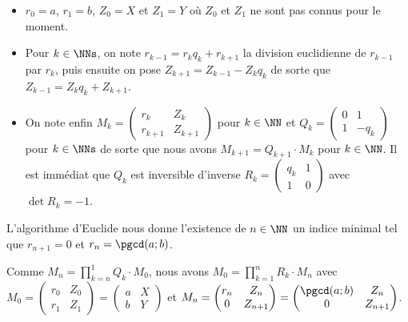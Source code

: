 \begin{itemize}[label=\small\textbullet]
	\item $r_0 = a$, $r_1 = b$, $Z_0 = X$ et $Z_1 = Y$ où $Z_0$ et $Z_1$ ne sont pas connus pour le moment.

	\item Pour $k \in \NNs$, on note $r_{k-1} = r_k q_k + r_{k+1}$ la division euclidienne de $r_{k-1}$ par $r_k$, puis ensuite on pose $Z_{k+1} = Z_{k-1} - Z_k q_k$ de sorte que $Z_{k-1} = Z_k q_k + Z_{k+1}$.

	\item On note enfin
	      $M_k 
           =
           \begin{pmatrix}
          	  r_k     & Z_k     \\ 
          	  r_{k+1} & Z_{k+1}
           \end{pmatrix}$
          pour $k \in \NN$ et
	      $Q_k 
           =
           \begin{pmatrix}
          	  0 & 1     \\ 
          	  1 & - q_k
           \end{pmatrix}$
          pour $k \in \NNs$ de sorte que nous avons $M_{k+1} = Q_{k+1} \cdot M_k$ pour $k \in \NN$. Il est immédiat que $Q_k$ est inversible d'inverse
	      $R_k 
           =
           \begin{pmatrix}
          	  q_k & 1 \\ 
          	  1   & 0
           \end{pmatrix}$
          avec $\det R_k = -1$.
\end{itemize}


L'algorithme d'Euclide nous donne l'existence de $n \in \NN$ un indice minimal tel que $r_{n+1} = 0$ et $r_n = \pgcd(a ; b)$.


Comme
$\displaystyle M_n = \prod_{k = n}^{1} Q_k \cdot M_0$,
nous avons
$\displaystyle M_0 = \prod_{k = 1}^{n} R_k \cdot M_n$
avec
$M_0
 =
 \begin{pmatrix}
    r_0 & Z_0 \\ 
    r_1 & Z_1
 \end{pmatrix}
 =
 \begin{pmatrix}
    a & X \\ 
    b & Y
 \end{pmatrix}$
et
$M_n
 =
 \begin{pmatrix}
    r_n & Z_n     \\ 
    0   & Z_{n+1}
 \end{pmatrix}
 =
 \begin{pmatrix}
    \pgcd(a ; b) & Z_n     \\ 
    0            & Z_{n+1}
 \end{pmatrix}$.
 
